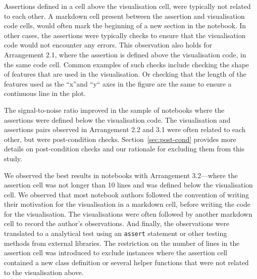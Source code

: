 \documentclass[conference]{IEEEtran}
\begin{document}
Assertions defined in a cell above the visualisation cell, were typically not related to each other. A markdown cell present between the assertion and visualisation code cells, would often mark the beginning of a new section in the notebook. In other cases, the assertions were typically checks to ensure that the visualisation code would not encounter any errors. This observation also holds for Arrangement 2.1, where the assertion is defined above the visualisation code, in the same code cell. Common examples of such checks include checking the shape of features that are used in the visualisation. Or checking that the length of the features used as the ``x''and ``y`` axes in the figure are the same to ensure a continuous line in the plot.

The signal-to-noise ratio improved in the sample of notebooks where the assertions were defined below the visualisation code. The visualisation and assertions pairs observed in Arrangement 2.2 and 3.1 were often related to each other, but were post-condition checks. Section~\ref{sec:post-cond} provides more details on post-condition checks and our rationale for excluding them from this study.

We observed the best results in notebooks with Arrangement 3.2---where the assertion cell was not longer than 10 lines and was defined below the visualisation cell. We observed that most notebook authors followed the convention of writing their motivation for the visualisation in a markdown cell, before writing the code for the visualisation. The visualisations were often followed by another markdown cell to record the author's observations. And finally, the observations were translated to a analytical test using an \texttt{assert} statement or other testing methods from external libraries. The restriction on the number of lines in the assertion cell was introduced to exclude instances where the assertion cell contained a new class definition or several helper functions that were not related to the visualisation above.
\end{document}
